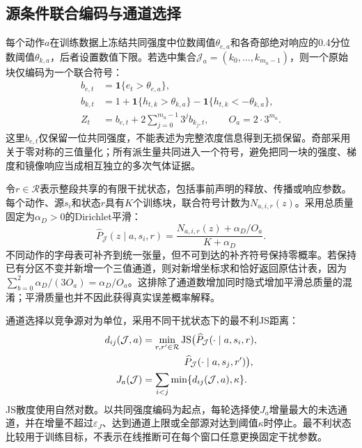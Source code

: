 \subsection{源条件联合编码与通道选择}

每个动作$a$在训练数据上冻结共同强度中位数阈值$\theta_{e,a}$和各奇部绝对响应的0.4分位数阈值$\theta_{k,a}$，后者设置数值下限。若选中集合$\mathcal J_a=(k_0,\ldots,k_{m_a-1})$，则一个原始块仅编码为一个联合符号：
\begin{equation}
\begin{aligned}
b_{e,t}&=\mathbf1\{e_t>\theta_{e,a}\},\\
b_{k,t}&=1+\mathbf1\{h_{t,k}>\theta_{k,a}\}
-\mathbf1\{h_{t,k}<-\theta_{k,a}\},\\
Z_t&=b_{e,t}+2\sum_{j=0}^{m_a-1}3^j b_{k_j,t},\qquad O_a=2\cdot3^{m_a}.
\end{aligned}
\label{eq:m1_joint_symbol}
\end{equation}
这里$b_{e,t}$仅保留一位共同强度，不能表述为完整浓度信息得到无损保留。奇部采用关于零对称的三值量化；所有派生量共同进入一个符号，避免把同一块的强度、梯度和镜像响应当成相互独立的多次气体证据。

令$r\in\mathcal R$表示整段共享的有限干扰状态，包括事前声明的释放、传播或响应参数。每个动作、源$s_i$和状态$r$具有$K$个训练块，联合符号计数为$N_{a,i,r}(z)$。采用总质量固定为$\alpha_D>0$的Dirichlet平滑：
\begin{equation}
\widehat P_{\mathcal J}(z\mid a,s_i,r)=
\frac{N_{a,i,r}(z)+\alpha_D/O_a}{K+\alpha_D}.
\label{eq:m1_joint_law}
\end{equation}
不同动作的字母表可补齐到统一张量，但不可到达的补齐符号保持零概率。若保持已有分区不变并新增一个三值通道，则对新增坐标求和恰好返回原估计表，因为$\sum_{b=0}^2\alpha_D/(3O_a)=\alpha_D/O_a$。这排除了通道数增加同时隐式增加平滑总质量的混淆；平滑质量也并不因此获得真实误差概率解释。

通道选择以竞争源对为单位，采用不同干扰状态下的最不利JS距离：
\begin{equation}
\begin{aligned}
d_{ij}(\mathcal J,a)&=\min_{r,r'\in\mathcal R}
\operatorname{JS}\!\big(\widehat P_{\mathcal J}(\cdot\mid a,s_i,r),\\
&\hspace{4.3em}\widehat P_{\mathcal J}(\cdot\mid a,s_j,r')\big),\\
J_a(\mathcal J)&=\sum_{i<j}\min\{d_{ij}(\mathcal J,a),\kappa\}.
\end{aligned}
\label{eq:m1_cover}
\end{equation}
JS散度使用自然对数。以共同强度编码为起点，每轮选择使$J_a$增量最大的未选通道，并在增量不超过$\varepsilon_J$、达到通道上限或全部源对达到阈值$\kappa$时停止。最不利状态比较用于训练目标，不表示在线推断可在每个窗口任意更换固定干扰参数。

